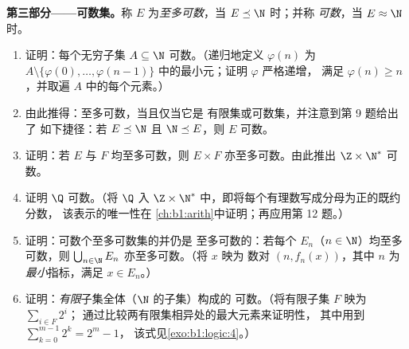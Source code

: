\begin{problem}
\medskip
\noindent\textbf{第三部分——可数集。}称 $E$
为\emph{至多可数}，当 $E \preceq \N$ 时；并称
\emph{可数}，当 $E \approx \N$ 时。
\begin{enumerate}[resume]
  \item 证明：每个无穷子集 $A \subseteq \N$
        可数。（递归地定义 $\varphi(n)$ 为
        $A \setminus \{\varphi(0), \dots,
        \varphi(n-1)\}$ 中的最小元；证明 $\varphi$ 严格递增，
        满足 $\varphi(n) \geq n$，并取遍
        $A$ 中的每个元素。）
  \item 由此推得：至多可数，当且仅当它是
        有限集或可数集，并注意到第 9 题给出了
        如下捷径：若 $E \preceq \N$ 且 $\N \preceq E$，则 $E$
        可数。
  \item 证明：若 $E$ 与 $F$ 均至多可数，则 $E
        \times F$ 亦至多可数。由此推出 $\Z \times \N^*$ 可数。
  \item 证明 $\Q$ 可数。（将 $\Q$ 入 $\Z \times
        \N^*$ 中，即将每个有理数写成分母为正的既约分数，
        该表示的唯一性在
        \cref{ch:b1:arith}中证明；再应用第 12 题。）
  \item 证明：可数个至多可数集的并仍是
        至多可数的：若每个 $E_n$（$n \in \N$）均至多可数，则
        $\bigcup_{n \in \N} E_n$ 亦至多可数。（将 $x$ 映为
        数对 $(n, f_n(x))$，其中 $n$ 为\emph{最小}指标，满足
        $x \in E_n$。）
  \item 证明：\emph{有限}子集全体（$\N$ 的子集）构成的
        可数。（将有限子集 $F$ 映为 $\sum_{i \in F} 2^i$；
        通过比较两有限集相异处的最大元素来证明性，
        其中用到 $\sum_{k=0}^{m-1} 2^k = 2^m - 1$，
        该式见\cref{exo:b1:logic:4}。）
\end{enumerate}


\end{problem}
